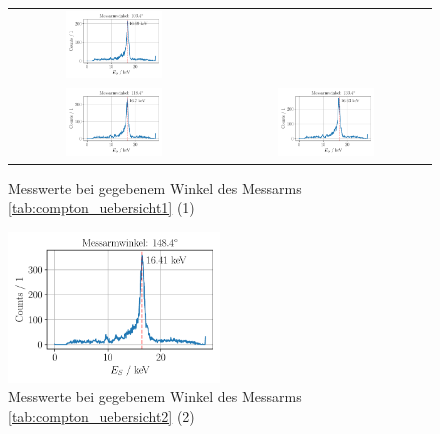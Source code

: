 \documentclass[ngerman]{scrartcl}
\begin{document}
\begin{figure}[H]
\begin{tabular}{cc}
      \includegraphics[width=0.48\textwidth]{../plots/energie_spektren_6.pdf} \\
      \includegraphics[width=0.48\textwidth]{../plots/energie_spektren_7.pdf} &
      \includegraphics[width=0.48\textwidth]{../plots/energie_spektren_8.pdf} \\
    \end{tabular}
    \caption{Messwerte bei gegebenem Winkel des Messarms \autoref{tab:compton_uebersicht1} (1)}
    \label{fig:DS_interferenzmuster}
  \end{figure}
\begin{figure}[H]
    \centering
    \begin{samepage}
        \includegraphics[width=0.5\textwidth]{../plots/energie_spektren_9.pdf} 
        \caption{Messwerte bei gegebenem Winkel des Messarms \autoref{tab:compton_uebersicht2} (2)}
        \label{fig:DS_interferenzmuster_final}
    \end{samepage}
\end{figure}
\end{document}
